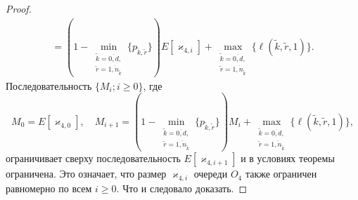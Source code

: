 \begin{proof}
\begin{multline*}
     =
      (1-\min_{\substack{\tilde{k}=\overline{0, d}, \\ \tilde{r}=\overline{1, n_{\tilde{k}}}}}{\{p_{\tilde{k}, \tilde{r}}\}})  E[\varkappa_{4, i}] + \max_{\substack{\tilde{k}=\overline{0, d}, \\ \tilde{r}=\overline{1, n_{\tilde{k}}}}}{\{\ell(\tilde{k}, \tilde{r}, 1)\}} .
\end{multline*}
Последовательность $\{M_i; i\geqslant 0\}$,  где 
$$
M_0=E[\varkappa_{4, 0}],  \quad M_{i+1}= (1-\min_{\substack{\tilde{k}=\overline{0, d}, \\ \tilde{r}=\overline{1, n_{\tilde{k}}}}}{\{p_{\tilde{k}, \tilde{r}}\}}) M_{i} + \max_{\substack{\tilde{k}=\overline{0, d}, \\ \tilde{r}=\overline{1, n_{\tilde{k}}}}}{\{\ell(\tilde{k}, \tilde{r}, 1)\}}, 
$$
ограничивает сверху последовательность $E[\varkappa_{4, i+1}]$ и в условиях теоремы ограничена. Это означает,  что размер $\varkappa_{4, i}$  очереди $O_4$ также ограничен равномерно по всем $i\geqslant 0$. Что и следовало доказать.
\end{proof}


